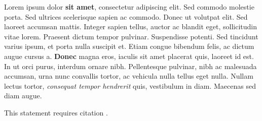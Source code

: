 Lorem ipsum dolor \textbf{sit amet}, consectetur adipiscing elit. Sed commodo
molestie porta. Sed ultrices scelerisque sapien ac commodo. Donec ut volutpat
elit. Sed laoreet accumsan mattis. Integer sapien tellus, auctor ac blandit
eget, sollicitudin vitae lorem. Praesent dictum tempor pulvinar. Suspendisse
potenti. Sed tincidunt varius ipsum, et porta nulla suscipit et. Etiam congue
bibendum felis, ac dictum augue cursus a. \textbf{Donec} magna eros, iaculis
sit amet placerat quis, laoreet id est. In ut orci purus, interdum ornare nibh.
Pellentesque pulvinar, nibh ac malesuada accumsan, urna nunc convallis tortor,
ac vehicula nulla tellus eget nulla. Nullam lectus tortor, \textit{consequat
tempor hendrerit} quis, vestibulum in diam. Maecenas sed diam augue.

This statement requires citation \cite{Smith:2012qr}.

